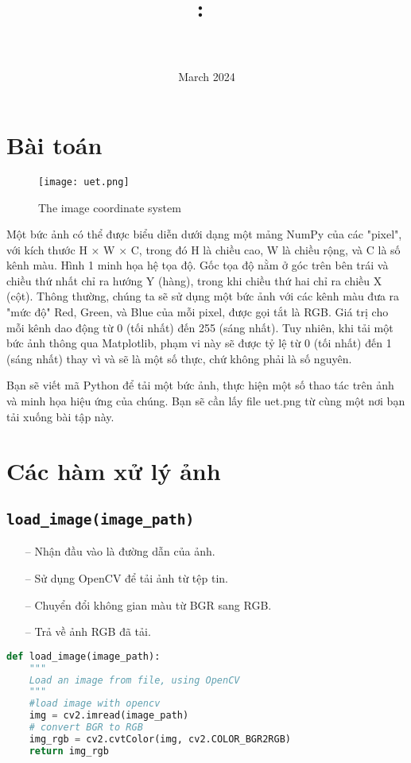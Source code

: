 \documentclass{article}
\title{
\vspace{-1in}
\textmd{\textbf{\hmwkClass:\ \hmwkTitle} \\ \hmwkAuthorName}\\
}
\author{}
\date{March 2024}
\begin{document}
\maketitle

\section{Bài toán}
\vspace{20pt}
\begin{figure}[h]
        \centering
        \texttt{[image: uet.png]}
        \caption{The image coordinate system}
        \label{fig:enter-labe}
\end{figure}

\vspace{20pt}

Một bức ảnh có thể được biểu diễn dưới dạng một mảng NumPy của các "pixel", với kích thước H × W × C, trong đó H là chiều cao, W là chiều rộng, và C là số kênh màu. Hình 1 minh họa hệ tọa độ. Gốc tọa độ nằm ở góc trên bên trái và chiều thứ nhất chỉ ra hướng Y (hàng), trong khi chiều thứ hai chỉ ra chiều X (cột). Thông thường, chúng ta sẽ sử dụng một bức ảnh với các kênh màu đưa ra "mức độ" Red, Green, và Blue của mỗi pixel, được gọi tắt là RGB. Giá trị cho mỗi kênh dao động từ 0 (tối nhất) đến 255 (sáng nhất). Tuy nhiên, khi tải một bức ảnh thông qua Matplotlib, phạm vi này sẽ được tỷ lệ từ 0 (tối nhất) đến 1 (sáng nhất) thay vì và sẽ là một số thực, chứ không phải là số nguyên.

Bạn sẽ viết mã Python để tải một bức ảnh, thực hiện một số thao tác trên ảnh và minh họa hiệu ứng của chúng. Bạn sẽ cần lấy file uet.png từ cùng một nơi bạn tải xuống bài tập này.

\clearpage
\section{Các hàm xử lý ảnh}

\subsection{\texttt{load\_image(image\_path)}}
\begin{itemize}
    \item[--] Nhận đầu vào là đường dẫn của ảnh.
    \item[--] Sử dụng OpenCV để tải ảnh từ tệp tin.
    \item[--] Chuyển đổi không gian màu từ BGR sang RGB.
    \item[--] Trả về ảnh RGB đã tải.
\end{itemize}
\begin{lstlisting}[language=Python]
def load_image(image_path):
    """
    Load an image from file, using OpenCV
    """
    #load image with opencv
    img = cv2.imread(image_path)
    # convert BGR to RGB
    img_rgb = cv2.cvtColor(img, cv2.COLOR_BGR2RGB)
    return img_rgb
\end{lstlisting}
\end{document}
